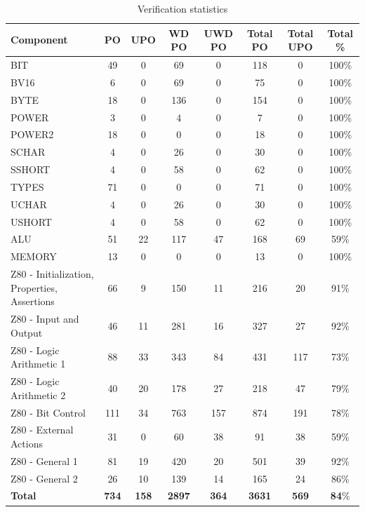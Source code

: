 \documentclass[a4paper]{llncs}
\begin{document}
\begin{table} [h]
\caption{Verification statistics }
\label{tab:completestatistcs}
\begin{center} 
\begin{tabular}{|p{3.1cm}|c|c||c|c||c|c|c|}
\hline 
{\scriptsize \textbf{Component}}&{\scriptsize \textbf{PO}}&{\scriptsize \textbf{UPO}}&{\scriptsize \textbf{WD PO}}&{\scriptsize \textbf{UWD PO }}&{\scriptsize \textbf{Total PO}}&{\scriptsize \textbf{Total UPO}}& {\scriptsize \textbf{Total \%}}  \\\hline
BIT&49&0&69&0&118&0&100\%\\\hline
BV16&6&0&69&0&75&0&100\%\\\hline
BYTE&18&0&136&0&154&0&100\%\\\hline
POWER&3&0&4&0&7&0&100\%\\\hline
POWER2&18&0 &0&0&18&0&100\%\\\hline
SCHAR&4&0&26&0&30&0&100\%\\\hline
SSHORT&4&0&58&0&62&0&100\%\\\hline
TYPES&71&0&0&0&71&0&100\%\\\hline
UCHAR&4&0&26&0&30&0&100\%\\\hline
USHORT&4&0&58&0&62&0&100\%\\\hline
ALU&51&22&117&47&168&69&59\%\\\hline
MEMORY&13&0&0&0&13&0&100\%\\\hline
Z80 -  {\scriptsize Initialization, Properties, Assertions} &66&9&150&11&216&20&91\%\\\hline
Z80 - {\scriptsize Input and Output}&46&11&281&16&327&27&92\%\\\hline
Z80 - {\scriptsize Logic Arithmetic 1}&88&33&343&84&431&117&73\%\\\hline
Z80 - {\scriptsize Logic Arithmetic 2}&40&20&178&27&218&47&79\%\\\hline
Z80 - {\scriptsize Bit Control}&111&34&763&157&874&191&78\%\\\hline
Z80 - {\scriptsize External Actions}&31&0&60&38&91&38&59\%\\\hline
Z80 - {\scriptsize General 1}&81&19&420&20&501&39&92\%\\\hline
Z80 - {\scriptsize General 2}&26&10&139&14&165&24&86\%\\\hline

\textbf{Total}&\textbf{734}&\textbf{158}&\textbf{2897}&\textbf{364}&\textbf{3631}&\textbf{569}&\textbf{84}\%\\\hline

\end{tabular}
\end{center} 
\end{table}
\end{document}
